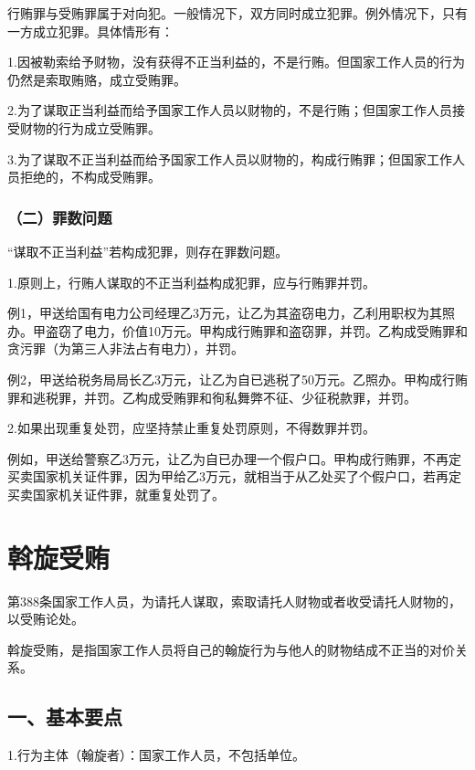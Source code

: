 行贿罪与受贿罪属于对向犯。一般情况下，双方同时成立犯罪。例外情况下，只有一方成立犯罪。具体情形有：

1.因被勒索给予财物，没有获得不正当利益的，不是行贿。但国家工作人员的行为仍然是索取贿赂，成立受贿罪。

2.为了谋取正当利益而给予国家工作人员以财物的，不是行贿；但国家工作人员接受财物的行为成立受贿罪。

3.为了谋取不正当利益而给予国家工作人员以财物的，构成行贿罪；但国家工作人员拒绝的，不构成受贿罪。

\subsubsection*{（二）罪数问题}

“谋取不正当利益”若构成犯罪，则存在罪数问题。

1.原则上，行贿人谋取的不正当利益构成犯罪，应与行贿罪并罚。

例1，甲送给国有电力公司经理乙3万元，让乙为其盗窃电力，乙利用职权为其照办。甲盗窃了电力，价值10万元。甲构成行贿罪和盗窃罪，并罚。乙构成受贿罪和贪污罪（为第三人非法占有电力），并罚。

例2，甲送给税务局局长乙3万元，让乙为自已逃税了50万元。乙照办。甲构成行贿罪和逃税罪，并罚。乙构成受贿罪和徇私舞弊不征、少征税款罪，并罚。

2.如果出现重复处罚，应坚持禁止重复处罚原则，不得数罪并罚。

例如，甲送给警察乙3万元，让乙为自已办理一个假户口。甲构成行贿罪，不再定买卖国家机关证件罪，因为甲给乙3万元，就相当于从乙处买了个假户口，若再定买卖国家机关证件罪，就重复处罚了。

\section{斡旋受贿}

第388条国家工作人员，为请托人谋取，索取请托人财物或者收受请托人财物的，以受贿论处。

斡旋受贿，是指国家工作人员将自己的翰旋行为与他人的财物结成不正当的对价关系。


\subsection*{一、基本要点}

1.行为主体（翰旋者）：国家工作人员，不包括单位。

